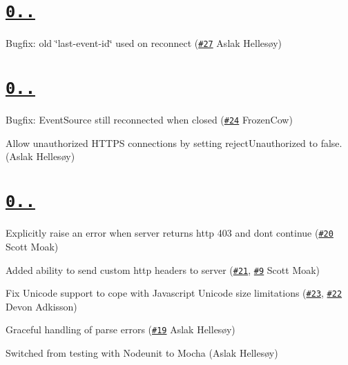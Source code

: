 \section*{\href{https://github.com/aslakhellesoy/eventsource-node/compare/v0.0.8...v0.0.9}{\tt 0..}}


\begin{DoxyItemize}
\item Bugfix\+: old \char`\"{}last-\/event-\/id\char`\"{} used on reconnect (\href{https://github.com/aslakhellesoy/eventsource-node/pull/27}{\tt \#27} Aslak Hellesøy)
\end{DoxyItemize}

\section*{\href{https://github.com/aslakhellesoy/eventsource-node/compare/v0.0.7...v0.0.8}{\tt 0..}}


\begin{DoxyItemize}
\item Bugfix\+: Event\+Source still reconnected when closed (\href{https://github.com/aslakhellesoy/eventsource-node/pull/24}{\tt \#24} Frozen\+Cow)
\item Allow unauthorized H\+T\+T\+PS connections by setting {\ttfamily reject\+Unauthorized} to false. (Aslak Hellesøy)
\end{DoxyItemize}

\section*{\href{https://github.com/aslakhellesoy/eventsource-node/compare/v0.0.6...v0.0.7}{\tt 0..}}


\begin{DoxyItemize}
\item Explicitly raise an error when server returns http 403 and don\textquotesingle{}t continue (\href{https://github.com/aslakhellesoy/eventsource-node/pull/20}{\tt \#20} Scott Moak)
\item Added ability to send custom http headers to server (\href{https://github.com/aslakhellesoy/eventsource-node/pull/21}{\tt \#21}, \href{https://github.com/aslakhellesoy/eventsource-node/issues/9}{\tt \#9} Scott Moak)
\item Fix Unicode support to cope with Javascript Unicode size limitations (\href{https://github.com/aslakhellesoy/eventsource-node/pull/23}{\tt \#23}, \href{https://github.com/aslakhellesoy/eventsource-node/issues/22}{\tt \#22} Devon Adkisson)
\item Graceful handling of parse errors (\href{https://github.com/aslakhellesoy/eventsource-node/issues/19}{\tt \#19} Aslak Hellesøy)
\item Switched from testing with Nodeunit to Mocha (Aslak Hellesøy)
\end{DoxyItemize}

